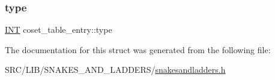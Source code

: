 \mbox{\label{structcoset__table__entry_af8ed5647e3903c6db930fc71c84e4b3a}} 
\subsubsection{\texorpdfstring{type}{type}}
{\footnotesize\ttfamily \mbox{\hyperlink{galois_8h_a09fddde158a3a20bd2dcadb609de11dc}{I\+NT}} coset\+\_\+table\+\_\+entry\+::type}



The documentation for this struct was generated from the following file\+:\begin{DoxyCompactItemize}
\item 
S\+R\+C/\+L\+I\+B/\+S\+N\+A\+K\+E\+S\+\_\+\+A\+N\+D\+\_\+\+L\+A\+D\+D\+E\+R\+S/\mbox{\hyperlink{snakesandladders_8h}{snakesandladders.\+h}}\end{DoxyCompactItemize}
